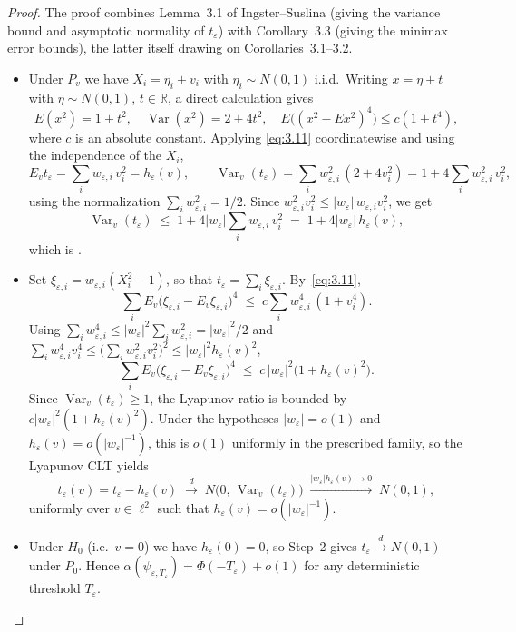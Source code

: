 \begin{proof}
The proof combines Lemma~3.1 of Ingster--Suslina (giving the variance bound and asymptotic
normality of $t_\varepsilon$) with Corollary~3.3 (giving the minimax error bounds), the
latter itself drawing on Corollaries~3.1--3.2.
\begin{itemize}
\item Under $P_v$ we have $X_i = \eta_i + v_i$ with $\eta_i \sim N(0,1)$ i.i.d.\ Writing
$x = \eta + t$ with $\eta \sim N(0,1)$, $t \in \mathbb{R}$, a direct calculation gives
\begin{equation}\label{eq:3.11}
  E(x^2) = 1 + t^2, \quad \operatorname{Var}(x^2) = 2 + 4t^2, \quad
  E\bigl((x^2 - E x^2)^4\bigr) \leq c(1 + t^4),
\end{equation}
where $c$ is an absolute constant. Applying \eqref{eq:3.11} coordinatewise and using the
independence of the $X_i$,
\[
  E_v t_\varepsilon = \sum_i w_{\varepsilon,i}\, v_i^2 = h_\varepsilon(v),
  \qquad
  \operatorname{Var}_v(t_\varepsilon)
   = \sum_i w_{\varepsilon,i}^2\,(2 + 4 v_i^2)
   = 1 + 4\sum_i w_{\varepsilon,i}^2\, v_i^2,
\]
using the normalization $\sum_i w_{\varepsilon,i}^2 = 1/2$. Since
$w_{\varepsilon,i}^2 v_i^2 \leq |w_\varepsilon|\, w_{\varepsilon,i} v_i^2$, we get
\[
  \operatorname{Var}_v(t_\varepsilon)
   \;\leq\; 1 + 4|w_\varepsilon|\sum_i w_{\varepsilon,i}\, v_i^2
   \;=\; 1 + 4|w_\varepsilon|\, h_\varepsilon(v),
\]
which is .
\item Set $\xi_{\varepsilon,i} = w_{\varepsilon,i}(X_i^2 - 1)$, so that $t_\varepsilon = \sum_i
\xi_{\varepsilon,i}$. By~\eqref{eq:3.11},
\[
  \sum_i E_v\bigl(\xi_{\varepsilon,i} - E_v\xi_{\varepsilon,i}\bigr)^4
   \;\leq\; c\sum_i w_{\varepsilon,i}^4\,(1 + v_i^4).
\]
Using $\sum_i w_{\varepsilon,i}^4 \leq |w_\varepsilon|^2 \sum_i w_{\varepsilon,i}^2 = |w_\varepsilon|^2/2$ and
$\sum_i w_{\varepsilon,i}^4 v_i^4 \leq \bigl(\sum_i w_{\varepsilon,i}^2 v_i^2\bigr)^2 \leq
|w_\varepsilon|^2 h_\varepsilon(v)^2$,
\[
  \sum_i E_v\bigl(\xi_{\varepsilon,i} - E_v\xi_{\varepsilon,i}\bigr)^4
   \;\leq\; c\,|w_\varepsilon|^2\bigl(1 + h_\varepsilon(v)^2\bigr).
\]
Since $\operatorname{Var}_v(t_\varepsilon) \geq 1$, the Lyapunov ratio is bounded by
$c|w_\varepsilon|^2(1 + h_\varepsilon(v)^2)$. Under the hypotheses
$|w_\varepsilon| = o(1)$ and $h_\varepsilon(v) = o(|w_\varepsilon|^{-1})$, this is $o(1)$
uniformly in the prescribed family, so the Lyapunov CLT yields
\[
  t_\varepsilon(v) = t_\varepsilon - h_\varepsilon(v)
   \;\xrightarrow{d}\; N\!\bigl(0,\,\operatorname{Var}_v(t_\varepsilon)\bigr)
   \;\xrightarrow{|w_\varepsilon| h_\varepsilon(v)\to 0}\; N(0, 1),
\]
uniformly over $v \in \ell^2$ such that $h_\varepsilon(v) = o(|w_\varepsilon|^{-1})$.
\item Under $H_0$ (i.e.\ $v = 0$) we have $h_\varepsilon(0) = 0$, so Step~2 gives
$t_\varepsilon \xrightarrow{d} N(0,1)$ under $P_0$. Hence $\alpha(\psi_{\varepsilon, T_\varepsilon}) =
\Phi(-T_\varepsilon) + o(1)$ for any deterministic threshold $T_\varepsilon$.


\end{itemize}
\end{proof}
